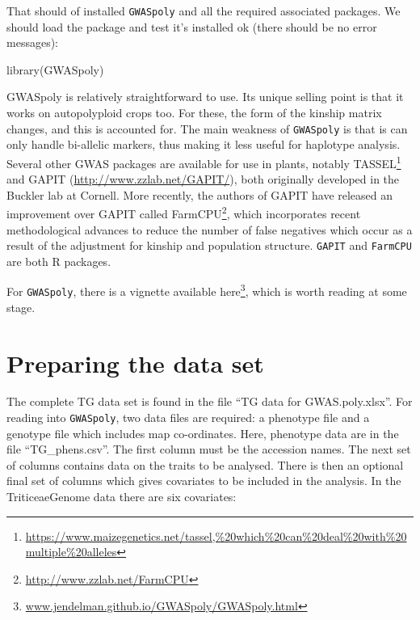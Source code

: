 \documentclass[
]{book}
\newenvironment{Shaded}{\begin{snugshade}}{\end{snugshade}}
\newcommand{\FunctionTok}[1]{\textcolor[rgb]{0.00,0.00,0.00}{#1}}
\newcommand{\NormalTok}[1]{#1}
\renewcommand{\href}[2]{#2\footnote{\url{#1}}}
\begin{document}
That should of installed \texttt{GWASpoly} and all the required associated packages. We should load the package and test it's installed ok (there should be no error messages):

\begin{Shaded}
\begin{Highlighting}[]
\FunctionTok{library}\NormalTok{(GWASpoly)}
\end{Highlighting}
\end{Shaded}

GWASpoly is relatively straightforward to use. Its unique selling point is that it works on autopolyploid crops too. For these, the form of the kinship matrix changes, and this is accounted for. The main weakness of \texttt{GWASpoly} is that is can only handle bi-allelic markers, thus making it less useful for haplotype analysis. Several other GWAS packages are available for use in plants, notably \href{https://www.maizegenetics.net/tassel,\%20which\%20can\%20deal\%20with\%20multiple\%20alleles}{TASSEL} and GAPIT (\url{http://www.zzlab.net/GAPIT/}), both originally developed in the Buckler lab at Cornell. More recently, the authors of GAPIT have released an improvement over GAPIT called \href{http://www.zzlab.net/FarmCPU}{FarmCPU}, which incorporates recent methodological advances to reduce the number of false negatives which occur as a result of the adjustment for kinship and population structure. \texttt{GAPIT} and \texttt{FarmCPU} are both R packages.

For \texttt{GWASpoly}, there is a vignette available \href{www.jendelman.github.io/GWASpoly/GWASpoly.html}{here}, which is worth reading at some stage.

\hypertarget{preparing-the-data-set}{%
\section{Preparing the data set}\label{preparing-the-data-set}}

The complete TG data set is found in the file ``TG data for GWAS.poly.xlsx''. For reading into \texttt{GWASpoly}, two data files are required: a phenotype file and a genotype file which includes map co-ordinates. Here, phenotype data are in the file ``TG\_phens.csv''. The first column must be the accession names. The next set of columns contains data on the traits to be analysed. There is then an optional final set of columns which gives covariates to be included in the analysis. In the TriticeaeGenome data there are six covariates:
\end{document}
